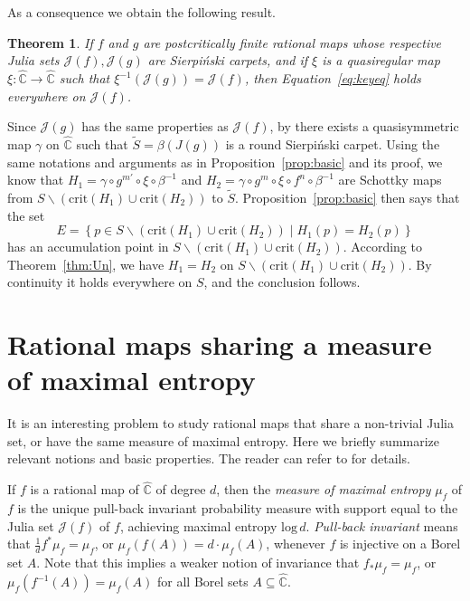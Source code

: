 \documentclass[12pt]{amsart}
\makeatletter
\newtheorem{thm}{Theorem}[section]
\newtheorem*{pf}{Proof}
\newcommand{\C}{\mathbb{C}}
\newcommand{\hC}{\widehat{\C}}
\newcommand{\sub}{\subseteq }
\newcommand{\J}{\mathcal{J}}
\newcommand{\co}{\colon}
\renewenvironment{pf}[1][\proofname]{%
  \par
  \pushQED{\qed}%
  \normalfont\topsep6\p@ \@plus6\p@ \trivlist
  \item[\hskip\labelsep\itshape
        \bfseries #1\@addpunct{:}]%
  \ignorespaces
}{%
  \popQED\endtrivlist
}
\makeatother
\begin{document}
As a consequence we obtain the following result.
\begin{thm}\label{thm:basicthm}
	If $f$ and $g$ are postcritically finite rational maps whose respective Julia sets $\J(f), \J(g)$ are Sierpi\'nski carpets, and 
  if $\xi$ is a quasiregular map $\xi\co \hC\to \hC$ such that $\xi^{-1}(\J(g))=\J(f)$,
  then Equation~\eqref{eq:keyeq} holds everywhere on $\J(f)$.
\end{thm}


\begin{pf}
	Since $\J(g)$ has the same properties as $\J(f)$, by \cite[Corollary 1.2]{Bo} there exists a quasisymmetric map $\gamma$ on $\hC$ such that 
	$\widetilde S=\beta(J(g))$ is a round Sierpi\'nski carpet.
  Using the same notations and arguments as in Proposition~\ref{prop:basic} and its proof, we know that $H_1=\gamma\circ g^{m'}\circ \xi\circ \beta^{-1}$ and $H_2=\gamma\circ g^m\circ \xi \circ f^n\circ \beta^{-1}$
are Schottky maps from $S\backslash (\mathrm{crit}(H_1)\cup \mathrm{crit}(H_2))$ to $\widetilde S$. 
Proposition~\ref{prop:basic} then says that the set 
$$E=\left\{p\in S\backslash (\mathrm{crit}(H_1)\cup \mathrm{crit}(H_2))\;|\;H_1(p)=H_2(p)\right\}$$
has an accumulation point in $S\backslash (\mathrm{crit}(H_1)\cup \mathrm{crit}(H_2))$.
According to Theorem~\ref{thm:Un}, we have $H_1=H_2$ 
on $S\backslash (\mathrm{crit}(H_1)\cup \mathrm{crit}(H_2))$.
By continuity it holds everywhere on $S$, and the conclusion follows.
\end{pf}


\section{Rational maps sharing a measure of maximal entropy}\label{sec:equilibrium}
\noindent It is an interesting problem to study rational maps that share a non-trivial Julia set, or have the same measure of maximal entropy.
Here we briefly summarize relevant notions and basic properties.
The reader can refer to \cite{DS} for details. 


If $f$ is a rational map of $\hC$ of degree $d$, then the \textit{measure of maximal entropy} $\mu_f$ of $f$ is the unique
pull-back invariant probability measure with support equal to the Julia set $\J(f)$ of $f$,  achieving maximal entropy $\mathrm{log}\, d$. \emph{Pull-back invariant} 
means that $\frac{1}{d}f^*\mu_f=\mu_f$, or $\mu_f(f(A))=d\cdot  \mu_f(A)$, whenever $f$ is injective on a Borel set $A$. Note that this implies a weaker notion of invariance that
$f_*\mu_f=\mu_f$, or $\mu_f(f^{-1}(A))=\mu_f(A)$ for all Borel sets $A\sub \hC$.
\end{document}
